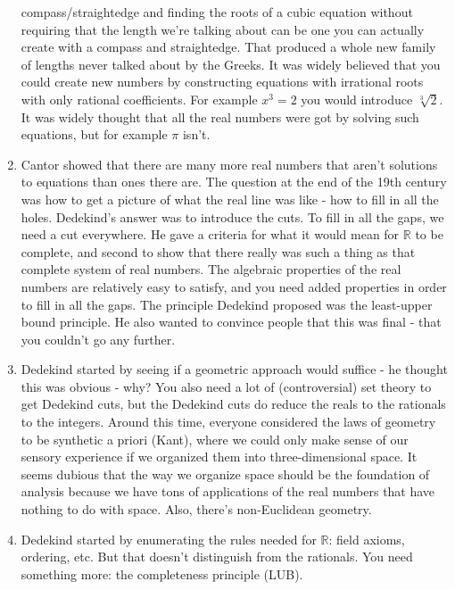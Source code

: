 \documentclass[12pt]{article}
\theoremstyle{definition}
\begin{document}
\begin{enumerate}
        compass/straightedge and finding the roots of a cubic equation without
        requiring that the length we're talking about can be one you can
        actually create with a compass and straightedge. That produced a whole
        new family of lengths never talked about by the Greeks. It was widely
        believed that you could create new numbers by constructing equations
        with irrational roots with only rational coefficients. For example $x^3
        = 2$ you would introduce $\sqrt[3]{2}$. It was widely thought that all
        the real numbers were got by solving such equations, but for example
        $\pi$ isn't.
    \item
        Cantor showed that there are many more real numbers that aren't
        solutions to equations than ones there are. The question at the end of
        the 19th century was how to get a picture of what the real line was
        like - how to fill in all the holes. Dedekind's answer was to introduce
        the cuts. To fill in all the gaps, we need a cut everywhere. He gave a
        criteria for what it would mean for $\mathbb{R}$ to be complete, and
        second to show that there really was such a thing as that complete
        system of real numbers. The algebraic properties of the real numbers
        are relatively easy to satisfy, and you need added properties in order
        to fill in all the gaps. The principle Dedekind proposed was the
        least-upper bound principle. He also wanted to convince people that
        this was final - that you couldn't go any further.
    \item
        Dedekind started by seeing if a geometric approach would suffice - he
        thought this was obvious - why? You also need a lot of (controversial)
        set theory to get Dedekind cuts, but the Dedekind cuts do reduce the
        reals to the rationals to the integers. Around this time, everyone
        considered the laws of geometry to be synthetic a priori (Kant), where
        we could only make sense of our sensory experience if we organized them
        into three-dimensional space. It seems dubious that the way we organize
        space should be the foundation of analysis because we have tons of
        applications of the real numbers that have nothing to do with space.
        Also, there's non-Euclidean geometry.
    \item
        Dedekind started by enumerating the rules needed for $\mathbb{R}$:
        field axioms, ordering, etc. But that doesn't distinguish from the
        rationals. You need something more: the completeness principle (LUB).

\end{enumerate}
\end{document}

